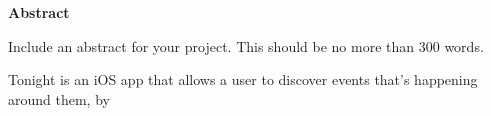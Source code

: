 \thispagestyle{empty}

\begin{center}
    {\LARGE\bf Abstract}
\end{center}

Include an abstract for your project. This should be no more than 300 words.

Tonight is an iOS app that allows a user to discover events that's happening around them, by 
